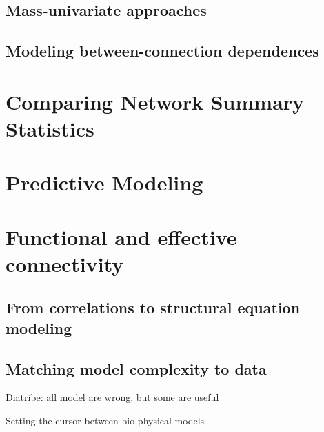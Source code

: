 \documentclass[5p]{elsarticle}
\begin{document}
\subsection{Mass-univariate approaches}

\subsection{Modeling between-connection dependences}


\section{Comparing Network Summary Statistics}


\section{Predictive Modeling}


\section{Functional and effective connectivity}

\subsection{From correlations to structural equation modeling}

\cite{mcintosh1994}

\subsection{Matching model complexity to data}

Diatribe: all model are wrong, but some are useful

Setting the cursor between bio-physical models 
\end{document}
